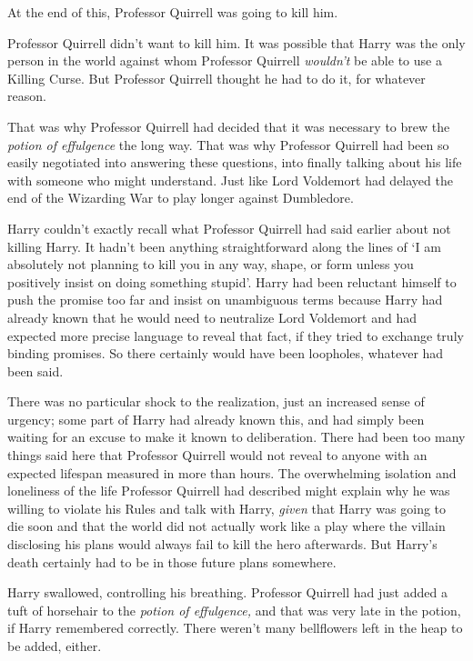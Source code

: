 At the end of this, Professor Quirrell was going to kill him.

Professor Quirrell didn’t want to kill him. It was possible that Harry was the only person in the world against whom Professor Quirrell \emph{wouldn’t} be able to use a Killing Curse. But Professor Quirrell thought he had to do it, for whatever reason.

That was why Professor Quirrell had decided that it was necessary to brew the \emph{potion of effulgence} the long way. That was why Professor Quirrell had been so easily negotiated into answering these questions, into finally talking about his life with someone who might understand. Just like Lord Voldemort had delayed the end of the Wizarding War to play longer against Dumbledore.

Harry couldn’t exactly recall what Professor Quirrell had said earlier about not killing Harry. It hadn’t been anything straightforward along the lines of ‘I am absolutely not planning to kill you in any way, shape, or form unless you positively insist on doing something stupid’. Harry had been reluctant himself to push the promise too far and insist on unambiguous terms because Harry had already known that he would need to neutralize Lord Voldemort and had expected more precise language to reveal that fact, if they tried to exchange truly binding promises. So there certainly would have been loopholes, whatever had been said.

There was no particular shock to the realization, just an increased sense of urgency; some part of Harry had already known this, and had simply been waiting for an excuse to make it known to deliberation. There had been too many things said here that Professor Quirrell would not reveal to anyone with an expected lifespan measured in more than hours. The overwhelming isolation and loneliness of the life Professor Quirrell had described might explain why he was willing to violate his Rules and talk with Harry, \emph{given} that Harry was going to die soon and that the world did not actually work like a play where the villain disclosing his plans would always fail to kill the hero afterwards. But Harry’s death certainly had to be in those future plans somewhere.

Harry swallowed, controlling his breathing. Professor Quirrell had just added a tuft of horsehair to the \emph{potion of effulgence,} and that was very late in the potion, if Harry remembered correctly. There weren’t many bellflowers left in the heap to be added, either.

